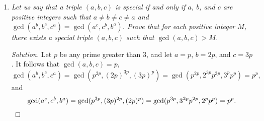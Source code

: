 \documentclass[12pt]{article}
\begin{document}
\begin{enumerate}[itemsep=2\bigskipamount,topsep=3\bigskipamount]
\item \textit{Let us say that a triple \((a, b, c)\) is \emph{special} if and only if \(a\), \(b\), and \(c\) are positive integers such that \(a \neq b \neq c \neq a\) and \(\gcd(a^{b}, b^{c}, c^{a}) = \gcd(a^{c}, c^{b}, b^{a})\). Prove that for each positive integer \(M\), there exists a special triple \((a, b, c)\) such that \(\gcd(a, b, c) > M\).}

\begin{proof}[Solution]
Let $p$ be any prime greater than 3, and let $a=p$, $b=2p$, and $c=3p$. It follows that $\gcd(a, b, c) = p$,
\[\gcd(a^b,b^c,c^a) = \gcd(p^{2p},(2p)^{3p},(3p)^{p}) = \gcd(p^{2p},2^{3p} p^{3p},3^p p^{p}) = p^p,\]
and
\[\gcd(a^c, c^b, b^a) = \gcd(p^{3p},(3p)^{2p},(2p)^{p}) = \gcd(p^{3p},3^{2p} p^{2p},2^p p^{p}) = p^p. \qedhere\]
\end{proof}
\end{enumerate}
\end{document}
